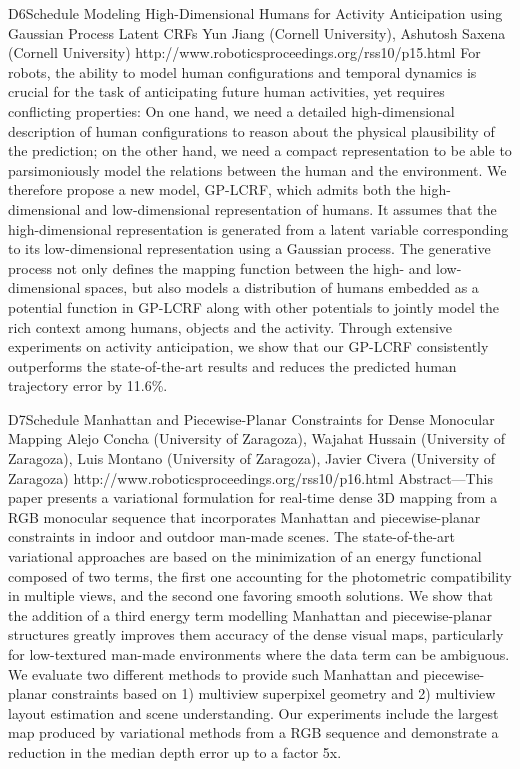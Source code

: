 \begin{spacing}{1.0}
\descriptionPaper
{D6}{Schedule}
{	
Modeling High-Dimensional Humans for Activity Anticipation using Gaussian Process Latent CRFs
}
{
Yun Jiang (Cornell University), Ashutosh Saxena (Cornell University)
}
{
http://www.roboticsproceedings.org/rss10/p15.html
}
{
For robots, the ability to model human configurations and temporal dynamics is crucial for the task of anticipating future human activities, yet requires conflicting properties: On one hand, we need a detailed high-dimensional description of human configurations to reason about the physical plausibility of the prediction; on the other hand, we need a compact representation to be able to parsimoniously model the relations between the human and the environment. We therefore propose a new model, GP-LCRF, which admits both the high-dimensional and low-dimensional representation of humans. It assumes that the high-dimensional representation is generated from a latent variable corresponding to its low-dimensional representation using a Gaussian process. The generative process not only defines the mapping function between the high- and low-dimensional spaces, but also models a distribution of humans embedded as a potential function in GP-LCRF along with other potentials to jointly model the rich context among humans, objects and the activity. Through extensive experiments on activity anticipation, we show that our GP-LCRF consistently outperforms the state-of-the-art results and reduces the predicted human trajectory error by 11.6\%.
}



\descriptionPaper
{D7}{Schedule}
{	
Manhattan and Piecewise-Planar Constraints for Dense Monocular Mapping 
}
{
Alejo Concha (University of Zaragoza), Wajahat Hussain (University of Zaragoza), Luis Montano (University of Zaragoza), Javier Civera (University of Zaragoza)
}
{
http://www.roboticsproceedings.org/rss10/p16.html
}
{
Abstract—This paper presents a variational formulation for real-time dense 3D mapping from a RGB monocular sequence that incorporates Manhattan and piecewise-planar constraints in indoor and outdoor man-made scenes. The state-of-the-art variational approaches are based on the minimization of an energy functional composed of two terms, the first one accounting for the photometric compatibility in multiple views, and the second one favoring smooth solutions. We show that the addition of a third energy term modelling Manhattan and piecewise-planar structures greatly improves them accuracy of the dense visual maps, particularly for low-textured man-made environments where the data term can be ambiguous. We evaluate two different methods to provide such Manhattan and piecewise-planar constraints based on 1) multiview superpixel geometry and 2) multiview layout estimation and scene understanding. Our experiments include the largest map produced by variational methods from a RGB sequence and demonstrate a reduction in the median depth error up to a factor 5x.
}





\end{spacing}
